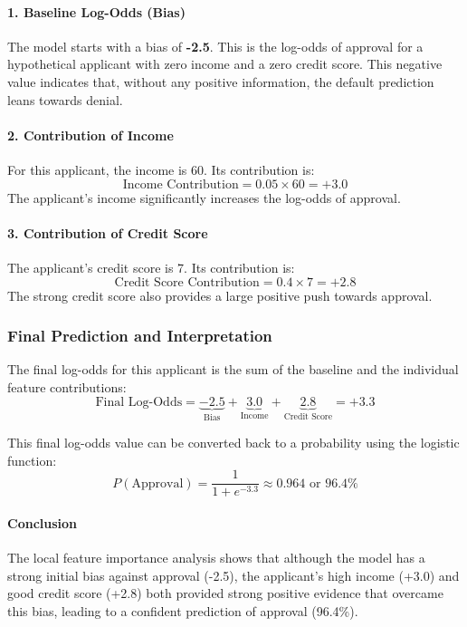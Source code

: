 \documentclass{article}
\begin{document}
\begin{multicols}{2}
	\paragraph{1. Baseline Log-Odds (Bias)} The model starts with a bias of \textbf{-2.5}. This is the log-odds of approval for a hypothetical applicant with zero income and a zero credit score. This negative value indicates that, without any positive information, the default prediction leans towards denial.

	\paragraph{2. Contribution of Income} For this applicant, the income is 60. Its contribution is:
	$$ \text{Income Contribution} = 0.05 \times 60 = +3.0 $$
	The applicant's income significantly increases the log-odds of approval.

	\paragraph{3. Contribution of Credit Score} The applicant's credit score is 7. Its contribution is:
	$$ \text{Credit Score Contribution} = 0.4 \times 7 = +2.8 $$
	The strong credit score also provides a large positive push towards approval.

	\subsubsection{Final Prediction and Interpretation}

	The final log-odds for this applicant is the sum of the baseline and the individual feature contributions:
	$$ \text{Final Log-Odds} = \underbrace{-2.5}_{\text{Bias}} + \underbrace{3.0}_{\text{Income}} + \underbrace{2.8}_{\text{Credit Score}} = +3.3 $$

	This final log-odds value can be converted back to a probability using the logistic function:
	$$ P(\text{Approval}) = \frac{1}{1 + e^{-3.3}} \approx 0.964 \text{ or } 96.4\% $$

	\paragraph{Conclusion} The local feature importance analysis shows that although the model has a strong initial bias against approval (-2.5), the applicant's high income (+3.0) and good credit score (+2.8) both provided strong positive evidence that overcame this bias, leading to a confident prediction of approval (96.4\%).



\end{multicols}
\end{document}
